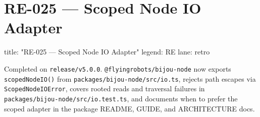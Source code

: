 \chapter{RE-025 --- Scoped Node IO Adapter}\label{record-383}

\smallskip

\begin{RecordMeta}
title: "RE-025 — Scoped Node IO Adapter"
legend: RE
lane: retro

\end{RecordMeta}

Completed on \texttt{r\allowbreak{}e\allowbreak{}l\allowbreak{}e\allowbreak{}a\allowbreak{}s\allowbreak{}e\allowbreak{}/\allowbreak{}v\allowbreak{}5\allowbreak{}.\allowbreak{}0\allowbreak{}.\allowbreak{}0}. \texttt{@\allowbreak{}f\allowbreak{}l\allowbreak{}y\allowbreak{}i\allowbreak{}n\allowbreak{}g\allowbreak{}r\allowbreak{}o\allowbreak{}b\allowbreak{}o\allowbreak{}t\allowbreak{}s\allowbreak{}/\allowbreak{}b\allowbreak{}i\allowbreak{}j\allowbreak{}o\allowbreak{}u\allowbreak{}-\allowbreak{}n\allowbreak{}o\allowbreak{}d\allowbreak{}e} now exports \texttt{s\allowbreak{}c\allowbreak{}o\allowbreak{}p\allowbreak{}e\allowbreak{}d\allowbreak{}N\allowbreak{}o\allowbreak{}d\allowbreak{}e\allowbreak{}I\allowbreak{}O\allowbreak{}(\allowbreak{})} from \texttt{p\allowbreak{}a\allowbreak{}c\allowbreak{}k\allowbreak{}a\allowbreak{}g\allowbreak{}e\allowbreak{}s\allowbreak{}/\allowbreak{}b\allowbreak{}i\allowbreak{}j\allowbreak{}o\allowbreak{}u\allowbreak{}-\allowbreak{}n\allowbreak{}o\allowbreak{}d\allowbreak{}e\allowbreak{}/\allowbreak{}s\allowbreak{}r\allowbreak{}c\allowbreak{}/\allowbreak{}i\allowbreak{}o\allowbreak{}.\allowbreak{}t\allowbreak{}s}, rejects path escapes via \texttt{S\allowbreak{}c\allowbreak{}o\allowbreak{}p\allowbreak{}e\allowbreak{}d\allowbreak{}N\allowbreak{}o\allowbreak{}d\allowbreak{}e\allowbreak{}I\allowbreak{}O\allowbreak{}E\allowbreak{}r\allowbreak{}r\allowbreak{}o\allowbreak{}r}, covers rooted reads and traversal failures in \texttt{p\allowbreak{}a\allowbreak{}c\allowbreak{}k\allowbreak{}a\allowbreak{}g\allowbreak{}e\allowbreak{}s\allowbreak{}/\allowbreak{}b\allowbreak{}i\allowbreak{}j\allowbreak{}o\allowbreak{}u\allowbreak{}-\allowbreak{}n\allowbreak{}o\allowbreak{}d\allowbreak{}e\allowbreak{}/\allowbreak{}s\allowbreak{}r\allowbreak{}c\allowbreak{}/\allowbreak{}i\allowbreak{}o\allowbreak{}.\allowbreak{}t\allowbreak{}e\allowbreak{}s\allowbreak{}t\allowbreak{}.\allowbreak{}t\allowbreak{}s}, and documents when to prefer the scoped adapter in the package README, GUIDE, and ARCHITECTURE docs.

